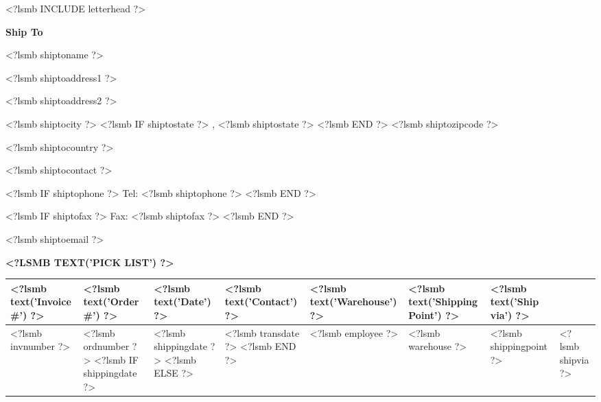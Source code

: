 \documentclass{scrartcl}
\begin{document}
\pagestyle{myheadings}
\thispagestyle{empty}

<?lsmb INCLUDE letterhead ?>


%
%
%
%

\vspace*{0.5cm}

\parbox[t]{.5\textwidth}{
  \textbf{Ship To}
} \hfill

\vspace{0.3cm}

\parbox[t]{.5\textwidth}{

<?lsmb shiptoname ?>

<?lsmb shiptoaddress1 ?>

<?lsmb shiptoaddress2 ?>

<?lsmb shiptocity ?>
<?lsmb IF shiptostate ?>
\hspace{-0.1cm}, <?lsmb shiptostate ?>
<?lsmb END ?>
<?lsmb shiptozipcode ?>

<?lsmb shiptocountry ?>
}
\parbox[t]{.5\textwidth}{
  <?lsmb shiptocontact ?>

  <?lsmb IF shiptophone ?>
  Tel: <?lsmb shiptophone ?>
  <?lsmb END ?>

  <?lsmb IF shiptofax ?>
  Fax: <?lsmb shiptofax ?>
  <?lsmb END ?>

  <?lsmb shiptoemail ?>
}
\hfill

\vspace{1cm}

\textbf{\MakeUppercase{<?lsmb text('Pick List') ?>}}
\hfill

\vspace{1cm}

\begin{tabularx}{\textwidth}{*{7}{|X}|} \hline
  \textbf{<?lsmb text('Invoice #') ?>} & \textbf{<?lsmb text('Order #') ?>}
   & \textbf{<?lsmb text('Date') ?>} & \textbf{<?lsmb text('Contact') ?>}
  & \textbf{<?lsmb text('Warehouse') ?>}
  & \textbf{<?lsmb text('Shipping Point') ?>}
  & \textbf{<?lsmb text('Ship via') ?>} \\ [0.5em]
  \hline
  <?lsmb invnumber ?> & <?lsmb ordnumber ?>
  <?lsmb IF shippingdate ?>
  & <?lsmb shippingdate ?>
  <?lsmb ELSE ?>
  & <?lsmb transdate ?>
  <?lsmb END ?>
  & <?lsmb employee ?> & <?lsmb warehouse ?> & <?lsmb shippingpoint ?> & <?lsmb shipvia ?> \\
  \hline
\end{tabularx}
\end{document}
